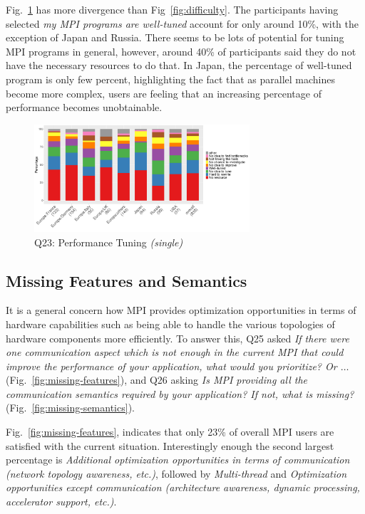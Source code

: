 \documentclass[preprint,5p,times]{elsarticle}
\def\myquote#1{{\it #1}}
\newcommand{\revision}[2]{{\color{blue}#2}}
\def\countries{contributors\xspace{}}%
\begin{document}
Fig.~\ref{fig:tuning} has more divergence than Fig~\ref{fig:difficulty}. The
participants having selected \myquote{my MPI programs are well-tuned} account
for only around 10\%, with the exception of Japan and Russia. There seems to be
\revision{a lots of room to tune}{lots of potential for tuning} MPI programs in general, however, around 40\% of
participants said they do not have the necessary resources to do that. In Japan,
the percentage of well-tuned program is only few percent, highlighting the fact
that as parallel machines become more complex, users are feeling that an
increasing percentage of performance \revision{become}{becomes} unobtainable.

\begin{figure}[tb]
\begin{center}
\includegraphics[width=8.0cm]{R-scripts/Q23.pdf}
\caption{Q23: Performance Tuning {\it(single)}}
\label{fig:tuning}
\vspace{-3mm}%
\end{center}
\end{figure}

\subsection{Missing Features and Semantics}

It is a general concern how MPI provides optimization
opportunities in terms of hardware capabilities such as being able to
handle the various topologies of hardware components more
efficiently. To answer this, Q25 asked \myquote{If there were one
communication aspect which is not enough in the current MPI that could
improve the performance of your application, what would you
prioritize? Or $\ldots$} (Fig.~\ref{fig:missing-features}), and Q26 asking
\myquote{Is MPI providing all the communication semantics required by your
application? If not, what is missing?}
(Fig.~\ref{fig:missing-semantics}).

Fig.~\ref{fig:missing-features}, indicates that only 23\% of overall MPI users
are satisfied with the current situation. Interestingly enough the second
largest percentage is \myquote{Additional optimization opportunities in terms of
communication (network topology awareness, etc.)}, followed by
\myquote{Multi-thread} and \myquote{Optimization opportunities except
communication (architecture awareness, dynamic processing, accelerator support,
etc.)}.
\end{document}
